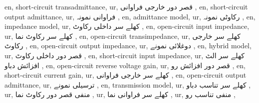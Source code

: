 en, short-circuit transadmittance,
ur, قصر دور خارجی فراوانی ,
en, short-circuit output admittance,
ur, فراوانی نمونہ ,
en, admittance model,
ur, رکاوٹی نمونہ ,
en, impedance model,
ur, کھلے سر داخلی رکاوٹ ,
en, open-circuit input impedance,
ur, کھلے سر رکاوٹ نما ,
en, open-circuit transimpedance,
ur, کھلے سر خارجی رکاوٹ ,
en, open-circuit output impedance,
ur, دوغلائی نمونے ,
en, hybrid model,
ur, قصر دور داخلی رکاوٹ ,
en, short-circuit input impedance,
ur, کھلے سر الٹ افزائش دباو ,
en, open-circuit reverse voltage gain,
ur, قصر دور افزائش رو ,
en, short-circuit current gain,
ur, کھلے سر خارجی فراوانی ,
en, open-circuit output admittance,
ur, ترسیلی نمونے ,
en, transmission model,
ur, کھلے سر تناسب دباو ,
ur, منفی قصر دور رکاوٹ نما ,
ur, کھلے سر فراوانی نما ,
ur, منفی تناسب رو ,
